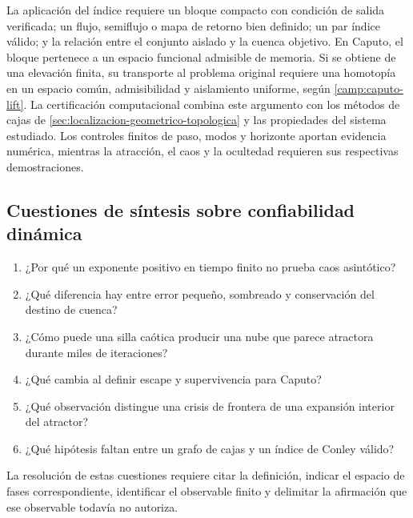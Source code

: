 La aplicación del índice requiere un bloque compacto con condición de
salida verificada; un flujo, semiflujo o mapa de retorno bien definido; un par
índice válido; y la relación entre el conjunto aislado y la cuenca objetivo.
En Caputo, el bloque pertenece a un espacio funcional admisible de memoria.
Si se obtiene de una elevación finita, su transporte al problema original
requiere una homotopía en un espacio común, admisibilidad y aislamiento
uniforme, según \cref{camp:caputo-lift}. La certificación computacional
combina este argumento con los métodos de cajas de
\cref{sec:localizacion-geometrico-topologica} y las propiedades del sistema
estudiado. Los controles finitos de paso, modos y horizonte aportan evidencia
numérica, mientras la atracción, el caos y la ocultedad requieren sus
respectivas demostraciones.

\subsection{Cuestiones de síntesis sobre confiabilidad dinámica}

\begin{enumerate}
 \item ¿Por qué un exponente positivo en tiempo finito no prueba caos
 asintótico?
 \item ¿Qué diferencia hay entre error pequeño, sombreado y conservación del
 destino de cuenca?
 \item ¿Cómo puede una silla caótica producir una nube que parece atractora
 durante miles de iteraciones?
 \item ¿Qué cambia al definir escape y supervivencia para Caputo?
 \item ¿Qué observación distingue una crisis de frontera de una expansión
 interior del atractor?
 \item ¿Qué hipótesis faltan entre un grafo de cajas y un índice de Conley
 válido?
\end{enumerate}

La resolución de estas cuestiones requiere citar la definición, indicar el
espacio de fases correspondiente, identificar el observable finito y delimitar
la afirmación que ese observable todavía no autoriza.
